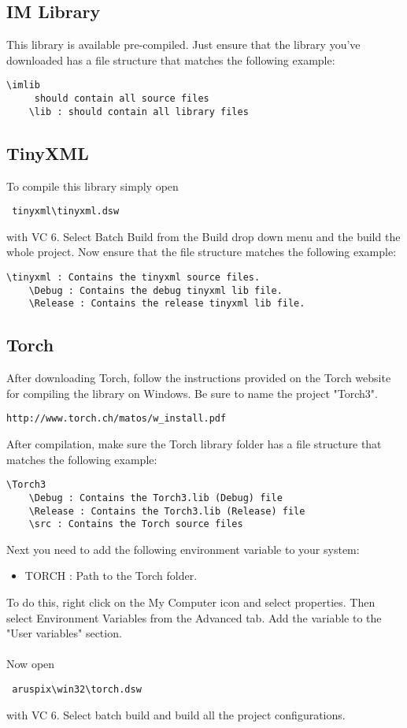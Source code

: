 \documentclass[]{article}
\begin{document}
\subsection{IM Library}

This library is available pre-compiled. Just ensure that the library you've
downloaded has a file structure that matches the following example:
\begin{verbatim}
\imlib
     should contain all source files
    \lib : should contain all library files
\end{verbatim}
 
\subsection{TinyXML}

To compile this library simply open \begin{verbatim} tinyxml\tinyxml.dsw \end{verbatim}
with VC 6. Select Batch Build from the Build drop down menu and the build the
whole project. Now ensure that the file structure matches the following example:
\begin{verbatim}
\tinyxml : Contains the tinyxml source files.
    \Debug : Contains the debug tinyxml lib file.
    \Release : Contains the release tinyxml lib file.
\end{verbatim}
	
\subsection{Torch}

After downloading Torch, follow the instructions provided on the Torch website
for compiling the library on Windows. Be sure to name the project "Torch3".
\begin{verbatim}http://www.torch.ch/matos/w_install.pdf \end{verbatim}
After compilation, make sure the Torch library folder has a file structure
that matches the following example:
\begin{verbatim}
\Torch3
    \Debug : Contains the Torch3.lib (Debug) file
    \Release : Contains the Torch3.lib (Release) file
    \src : Contains the Torch source files
\end{verbatim}
Next you need to add the following environment variable to your system: 
\begin{itemize}
	\item TORCH : Path to the Torch folder. 
\end{itemize}
To do this, right click on the My Computer icon and select properties. Then
select Environment Variables from the Advanced tab. Add the variable to the
"User variables" section.\\\\
Now open \begin{verbatim} aruspix\win32\torch.dsw \end{verbatim} with VC 6.
Select batch build and build all the project configurations.
  
\end{document}
